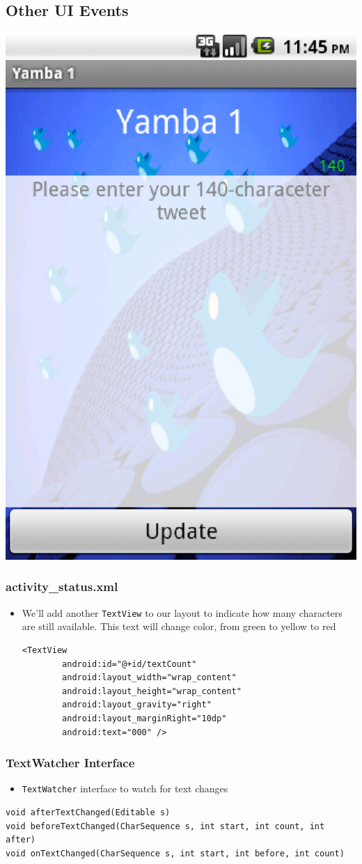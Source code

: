 \subsection{Other UI Events}
\begin{frame}[fragile]
\centering
\includegraphics[width=0.4 \textwidth]{fig-063.eps}

\end{frame}
\begin{frame}
\frametitle{activity\_status.xml}
\begin{itemize}
\item We’ll add another \texttt{TextView} to our layout to indicate how
many characters are still available. This text will change color, from green to yellow to
red
\lstset{language=XML, style=eclipse}
\begin{adjustbox}{width=0.8 \textwidth}
\begin{lstlisting}[caption=activity\_status.xml, escapechar=!]
<TextView
        android:id="@+id/textCount"
        android:layout_width="wrap_content"
        android:layout_height="wrap_content"
        android:layout_gravity="right"
        android:layout_marginRight="10dp"
        android:text="000" />
\end{lstlisting}
\end{adjustbox}
\end{itemize}

\end{frame}
\begin{frame}[containsverbatim]
\frametitle{TextWatcher Interface}
\begin{itemize}
\item \texttt{TextWatcher} interface to watch for text changes

\end{itemize}

\lstset{language=java, style=eclipse, breaklines=true, tabsize=2, basicstyle=\footnotesize , numbers=none}
\begin{lstlisting}
void afterTextChanged(Editable s)
void beforeTextChanged(CharSequence s, int start, int count, int after)
void onTextChanged(CharSequence s, int start, int before, int count)
\end{lstlisting}
\end{frame}
